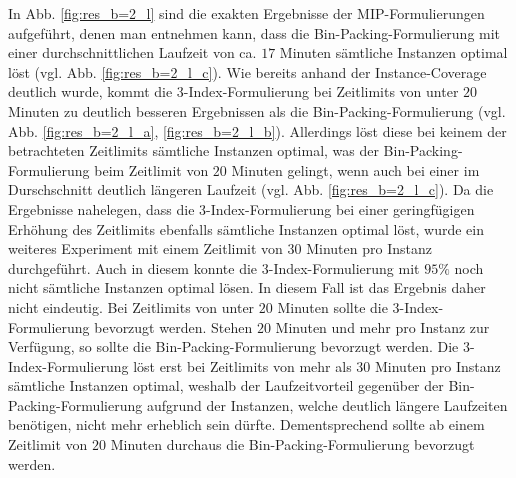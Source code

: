 In Abb. \ref{fig:res_b=2_l} sind die exakten Ergebnisse der MIP-Formulierungen aufgeführt, denen man
entnehmen kann, dass die Bin-Packing-Formulierung mit einer durchschnittlichen Laufzeit von ca. $17$ Minuten sämtliche Instanzen optimal löst (vgl. Abb. \ref{fig:res_b=2_l_c}). Wie bereits anhand der Instance-Coverage deutlich wurde,
kommt die 3-Index-Formulierung bei Zeitlimits von unter $20$ Minuten zu deutlich besseren Ergebnissen als die Bin-Packing-Formulierung (vgl. Abb. \ref{fig:res_b=2_l_a}, \ref{fig:res_b=2_l_b}). Allerdings löst diese bei keinem der betrachteten Zeitlimits sämtliche Instanzen optimal, was der Bin-Packing-Formulierung beim Zeitlimit von $20$ Minuten gelingt, wenn auch bei einer im Durschschnitt deutlich längeren Laufzeit (vgl. Abb. \ref{fig:res_b=2_l_c}). Da die Ergebnisse nahelegen, dass die 3-Index-Formulierung
bei einer geringfügigen Erhöhung des Zeitlimits ebenfalls sämtliche Instanzen optimal löst, wurde ein weiteres Experiment mit einem Zeitlimit von $30$ Minuten pro Instanz durchgeführt. Auch in diesem konnte die 3-Index-Formulierung mit $95 \%$ noch nicht sämtliche Instanzen optimal lösen. In diesem Fall ist das Ergebnis daher nicht eindeutig. Bei Zeitlimits von unter $20$ Minuten sollte die 3-Index-Formulierung bevorzugt werden. Stehen $20$ Minuten und mehr pro Instanz zur Verfügung, so sollte die Bin-Packing-Formulierung bevorzugt werden. Die 3-Index-Formulierung löst erst bei Zeitlimits von mehr als $30$ Minuten pro Instanz sämtliche Instanzen optimal, weshalb der Laufzeitvorteil gegenüber der Bin-Packing-Formulierung aufgrund der Instanzen, welche deutlich längere Laufzeiten benötigen, nicht mehr erheblich sein dürfte. Dementsprechend sollte ab einem Zeitlimit von $20$ Minuten durchaus die Bin-Packing-Formulierung bevorzugt werden.

